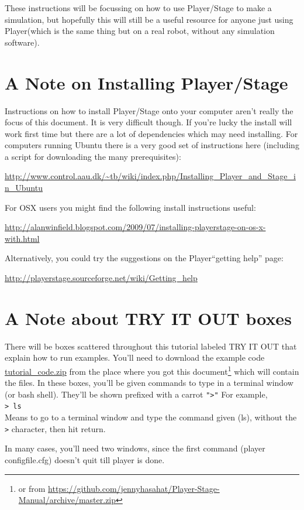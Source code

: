 \documentclass[a4paper]{report}
\newcommand{\plst}{Player/Stage\xspace}
\newcommand{\pl}{Player\xspace}
\begin{document}
These instructions will be focussing on how to use \plst to make a simulation, but hopefully this will still be a useful resource for anyone just using \pl (which is the same thing but on a real robot, without any simulation software).

\section{A Note on Installing \plst}
Instructions on how to install \plst onto your computer aren't really the focus of this document. It is very difficult though. If you're lucky the install will work first time but there are a lot of dependencies which may need installing. For computers running Ubuntu there is a very good set of instructions here (including a script for downloading the many prerequisites):
\begin{center}
\url{http://www.control.aau.dk/~tb/wiki/index.php/Installing_Player_and_Stage_in_Ubuntu}
\end{center}
For OSX users you might find the following install instructions useful:
\begin{center}
\url{http://alanwinfield.blogspot.com/2009/07/installing-playerstage-on-os-x-with.html}
\end{center}
Alternatively, you could try the suggestions on the \pl ``getting help'' page:
\begin{center}
	\url{http://playerstage.sourceforge.net/wiki/Getting_help}
\end{center}

\section{A Note about TRY IT OUT boxes}
There will be boxes scattered throughout this tutorial labeled TRY IT OUT
that explain how to run examples. You'll need to download the example code
\url{tutorial\_code.zip} from the place where you got this
document\footnote{or from
\url{https://github.com/jennyhasahat/Player-Stage-Manual/archive/master.zip}}
which will contain the files. In these boxes, you'll be given commands to
type in a terminal
window (or bash shell). They'll be shown prefixed with a carrot {\tt ">"} For
example, \\
{\tt > ls } \\
Means to go to a terminal window and type the command given (ls), without
the {\tt >} character, then hit return.

In many cases, you'll need two windows, since the first command (player
configfile.cfg) doesn't quit till player is done.  
\end{document}
